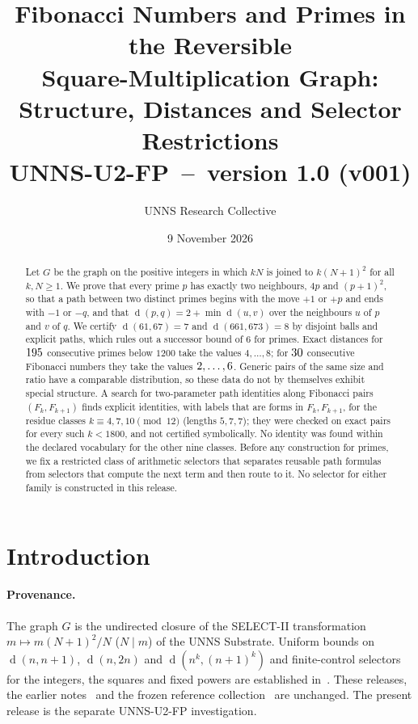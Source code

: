 \documentclass[11pt]{article}
\title{\textbf{Fibonacci Numbers and Primes in the Reversible\\ Square-Multiplication Graph: Structure, Distances and Selector Restrictions}\\[4pt]
\large UNNS-U2-FP \,--\, version 1.0 (v001)}
\author{UNNS Research Collective}
\date{9 November 2026}
\theoremstyle{definition}
\newcommand{\dist}{\operatorname{d}}
\begin{document}
\maketitle

\begin{abstract}
\noindent Let $G$ be the graph on the positive integers in which $kN$ is joined to $k(N+1)^2$ for all $k,N\ge1$.
We prove that every prime $p$ has exactly two neighbours, $4p$ and $(p+1)^2$, so that a path between two distinct primes begins with the move $+1$ or $+p$ and ends with $-1$ or $-q$,
and that $\dist(p,q)=2+\min\dist(u,v)$ over the neighbours $u$ of $p$ and $v$ of $q$. We certify $\dist(61,67)=7$ and $\dist(661,673)=8$ by disjoint balls and explicit paths, which rules out a successor bound of $6$ for primes.
Exact distances for $195$ consecutive primes below $1200$ take the values $4,\dots,8$; for $30$ consecutive Fibonacci numbers they take the values $2,\dots,6$.
Generic pairs of the same size and ratio have a comparable distribution, so these data do not by themselves exhibit special structure.
A search for two-parameter path identities along Fibonacci pairs $(F_k,F_{k+1})$ finds explicit identities, with labels that are forms in $F_k,F_{k+1}$, for the residue classes $k\equiv4,7,10\pmod{12}$ (lengths $5,7,7$); they were checked on exact pairs for every such $k<1800$, and not certified symbolically. No identity was found within the declared vocabulary for the other nine classes.
Before any construction for primes, we fix a restricted class of arithmetic selectors that separates reusable path formulas from selectors that compute the next term and then route to it. No selector for either family is constructed in this release.
\end{abstract}

\section{Introduction}\label{sec:intro}
\paragraph{Provenance.} The graph $G$ is the undirected closure of the SELECT-II transformation $m\mapsto m(N+1)^2/N$ ($N\mid m$) of the UNNS Substrate. Uniform bounds on $\dist(n,n+1)$, $\dist(n,2n)$ and $\dist(n^k,(n+1)^k)$ and finite-control selectors for the integers, the squares and fixed powers are established in~\cite{u1bnd,u2,sq}. These releases, the earlier notes~\cite{u0,u1} and the frozen reference collection~\cite{gig,repo} are unchanged.
The present release is the separate UNNS-U2-FP investigation.
\end{document}
